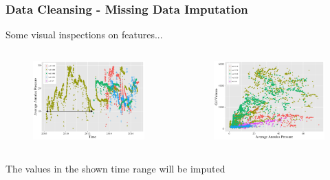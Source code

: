 \documentclass[xcolor=table]{beamer}
\begin{document}
\begin{frame}
\frametitle{Data Cleansing - Missing Data Imputation}
\begin{block}{}
Some visual inspections on features...
\end{block}
\begin{columns}[c]

\begin{figure}
\includegraphics[width=1\linewidth,left]{aap_t_copy.png} 
\end{figure}

\begin{figure}
\includegraphics[width=1\linewidth, right]{o_aap.png}
\end{figure}
\end{columns}

\begin{block}{}
The values in the shown time range will be imputed
\end{block}
\end{frame}
\end{document}
